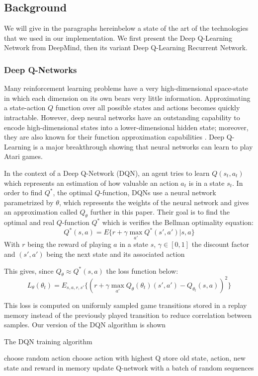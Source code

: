 \documentclass[letterpaper]{article}
\begin{document}
\subsection{Background} We will give in the paragraphs hereinbelow a state of
the art of the technologies that we used in our implementation. We first present
the Deep Q-Learning Network from DeepMind, then its variant Deep Q-Learning
Recurrent Network.

\subsubsection{Deep Q-Networks}
Many reinforcement learning problems have a very high-dimensional space-state
in which each dimension on its own bears very little information. Approximating
a state-action $Q$ function over all possible states and actions becomes quickly
intractable. However, deep neural networks have an outstanding capability to
encode high-dimensional states into a lower-dimensional hidden state; moreover,
they are also known for their function approximation capabilities
\citep{Hornik1991}. Deep Q-Learning \citep{Mnih2015} is a major breakthrough
showing that neural networks can learn to play Atari games.

In the context of a Deep Q-Network (DQN), an agent tries to learn
$Q(s_t,a_t)$ which represents an
estimation of how valuable an action $a_t$ is in a state $s_t$. In order to
find $Q^*$, the optimal $Q$-function, DQNs use a neural network
parametrized by $\theta$, which represents the weights of the neural network
and gives an approximation called $Q_\theta$ further in this paper. Their goal
is to find the optimal and real $Q$-function $Q^*$ which is verifies the Bellman
optimality equation:
$$ Q^*(s,a) = E\{r + \gamma \max_{a'}Q^*(s',a')|s,a\} $$
With $r$ being the reward of playing $a$ in a state $s$, $\gamma\in [0,1]$ the
discount factor and $(s',a')$ being the next state and its associated action

This gives, since $Q_{\theta} \approx Q^*(s,a)$ the loss function below:
$$ L_\theta(\theta_t) = E_{s,a,r,s'}\{(r +\gamma \max_{a'}Q_\theta(\theta_t)(s' , a' )-Q_{\theta_t}(s,a))^2\}$$

This loss is computed on uniformly sampled game transitions stored in a
replay memory instead of the previously played transition to reduce correlation
between samples. Our version of the DQN algorithm is shown
\begin{algorithm}
\caption{The DQN training algorithm}\label{dqn}
\begin{algorithmic}[1]
				\State choose random action
			\Else
				\State choose action with highest Q
			\EndIf
			\State store old state, action, new state and reward in memory
		\EndWhile
			\State update Q-network with a batch of random sequences
		\EndFor
	\EndFor
\end{algorithmic}
\end{algorithm}
\end{document}
